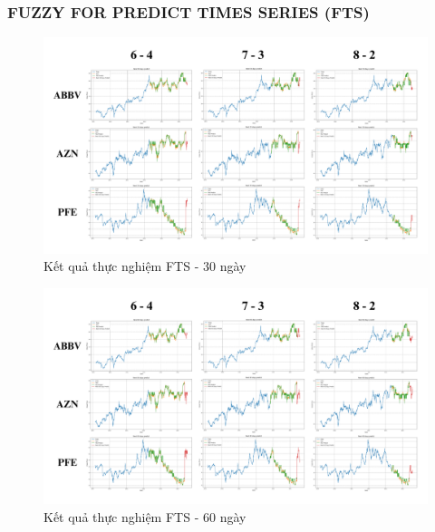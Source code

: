 \documentclass[conference]{IEEEtran}
\begin{document}
\subsubsection{FUZZY FOR PREDICT TIMES SERIES (FTS)}
\begin{figure}[H]
    \centering
    \begin{minipage}{0.5\textwidth}
    \centering
    \includegraphics[width=1\textwidth]{Image/FTS30.png}
    \caption{Kết quả thực nghiệm FTS - 30 ngày}
    \label{fig:1}
    \end{minipage}
\end{figure}
\begin{figure}[H]
    \centering
    \begin{minipage}{0.5\textwidth}
    \centering
    \includegraphics[width=1\textwidth]{Image/FTS60.png}
    \caption{Kết quả thực nghiệm FTS - 60 ngày}
    \label{fig:1}
    \end{minipage}
\end{figure}
\end{document}
